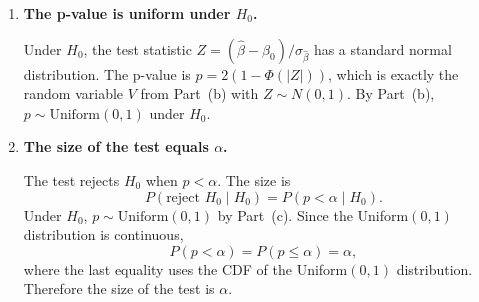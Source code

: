 \documentclass[12pt]{article}
\begin{document}
\begin{enumerate}
\begin{enumerate}
\item \textbf{The p-value is uniform under $H_0$.}

Under $H_0$, the test statistic $Z = (\hat{\beta} - \beta_0)/\sigma_{\hat{\beta}}$ has a standard normal distribution. The p-value is $p = 2(1 - \Phi(|Z|))$, which is exactly the random variable $V$ from Part~(b) with $Z \sim N(0,1)$. By Part~(b), $p \sim \text{Uniform}(0,1)$ under $H_0$.

\bigskip

\item \textbf{The size of the test equals $\alpha$.}

The test rejects $H_0$ when $p < \alpha$. The size is
$$
P(\text{reject } H_0 \mid H_0) = P(p < \alpha \mid H_0).
$$
Under $H_0$, $p \sim \text{Uniform}(0,1)$ by Part~(c). Since the Uniform$(0,1)$ distribution is continuous,
$$
P(p < \alpha) = P(p \le \alpha) = \alpha,
$$
where the last equality uses the CDF of the Uniform$(0,1)$ distribution. Therefore the size of the test is $\alpha$.

\end{enumerate}

\end{enumerate}
\end{document}
